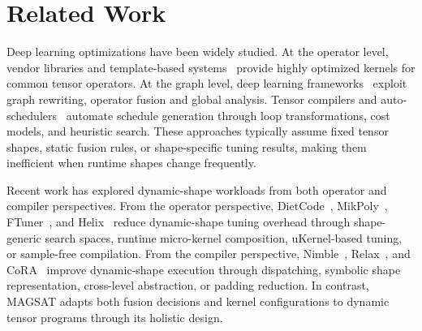 \section{Related Work}  %
\label{sec:relatedwork}




Deep learning optimizations have been widely studied. At the operator level, vendor libraries and template-based systems~\cite{nvidia24cublas,chetlur2014cudnn,nvidia22cutlass,tillet2019triton,cheng2025pipethreader} provide highly optimized kernels for common tensor operators. At the graph level, deep learning frameworks~\cite{ansel2024pytorch,niu2021dnnfusion,shi2023welder,zheng2023chimera,wu2025mirage}
exploit graph rewriting, operator fusion and global analysis. 
Tensor compilers and auto-schedulers~\cite{chen2018tvm,chen2018autotvm,zheng2020ansor,ragan2013halide}
automate schedule generation through loop transformations, cost models, and heuristic search. 
These approaches typically assume fixed tensor shapes, static fusion rules, or shape-specific tuning results, making them inefficient when runtime shapes change frequently.

Recent work has explored dynamic-shape workloads from both operator and compiler perspectives. From the operator perspective, DietCode~\cite{zheng2022dietcode}, MikPoly~\cite{yu2024mikpoly}, FTuner~\cite{mu2024ftuner}, and Helix~\cite{zhou2025helix} reduce dynamic-shape tuning overhead through shape-generic search spaces, runtime micro-kernel composition, uKernel-based tuning, or sample-free compilation. From the compiler perspective, Nimble~\cite{shen2021nimble}, Relax~\cite{lai2025relax}, and CoRA~\cite{fegade2022cora} improve dynamic-shape execution through dispatching, symbolic shape representation, cross-level abstraction, or padding reduction. In contrast, MAGSAT adapts both fusion decisions and kernel configurations to dynamic tensor programs through its holistic design.

